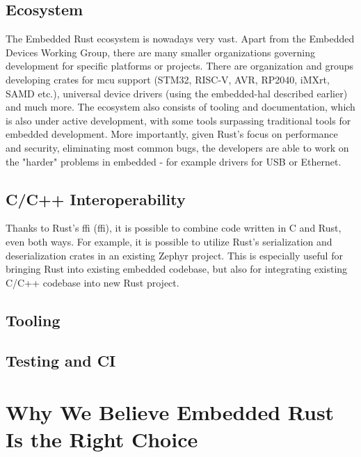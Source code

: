 \subsection{Ecosystem}
\label{subsec:ecosystem}
The Embedded Rust ecosystem is nowadays very vast.
Apart from the Embedded Devices Working Group, there are many smaller organizations governing development for specific platforms or projects.
There are organization and groups developing crates for \acs{mcu} support (STM32, RISC-V, AVR, RP2040, iMXrt, SAMD etc.), universal device drivers (using the embedded-hal described earlier) and much more.
The ecosystem also consists of tooling and documentation, which is also under active development, with some tools surpassing traditional tools for embedded development.
More importantly, given Rust's focus on performance and security, eliminating most common bugs, the developers are able to work on the "harder" problems in embedded - for example drivers for USB\cite{noauthor_stm32-rsstm32-usbd_2021} or Ethernet\cite{noauthor_stm32-rsstm32-eth_2021}.

\subsection{C/C++ Interoperability}
\label{subsec:ccpp_interop}
Thanks to Rust's \acs{ffi} (\acl{ffi}), it is possible to combine code written in C and Rust, even both ways\cite{rust_embedded_devices_wg_interoperability_nodate}.
For example, it is possible to utilize Rust's serialization and deserialization crates in an existing Zephyr project\cite{wolff_embedding_nodate}.
This is especially useful for bringing Rust into existing embedded codebase, but also for integrating existing C/C++ codebase into new Rust project.

\subsection{Tooling}
\label{subsec:tooling}

\subsection{Testing and CI}
\label{subsec:testing_ci}

\section{Why We Believe Embedded Rust Is the Right Choice}
\label{sec:embedded_rust_reasoning}